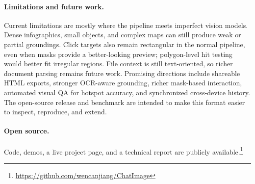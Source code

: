 \paragraph{Limitations and future work.}
Current limitations are mostly where the pipeline meets imperfect vision
models. Dense infographics, small objects, and complex maps can still produce
weak or partial groundings. Click targets also remain rectangular in the normal
pipeline, even when masks provide a better-looking preview; polygon-level hit
testing would better fit irregular regions. File context is still text-oriented,
so richer document parsing remains future work. Promising directions include
shareable HTML exports, stronger OCR-aware grounding, richer mask-based
interaction, automated visual QA for hotspot accuracy, and synchronized
cross-device history. The open-source release and benchmark are intended to
make this format easier to inspect, reproduce, and extend.

\paragraph{Open source.}
Code, demos, a live project page, and a technical report are publicly
available.\footnote{\url{https://github.com/wencanjiang/ChatImage}}
